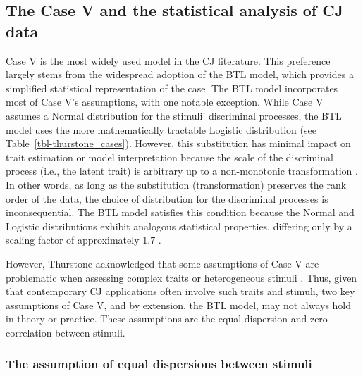 \documentclass[
  authoryear,
  review,
  1p]{elsarticle}
\begin{document}
\subsection{The Case V and the statistical analysis of CJ
data}\label{sec-theory-issue1}

Case V is the most widely used model in the CJ literature. This
preference largely stems from the widespread adoption of the BTL model,
which provides a simplified statistical representation of the case. The
BTL model incorporates most of Case V's assumptions, with one notable
exception. While Case V assumes a Normal distribution for the stimuli'
discriminal processes, the BTL model uses the more mathematically
tractable Logistic distribution \citep{Andrich_1978, Bramley_2008} (see
Table~\ref{tbl-thurstone_cases}). However, this substitution has minimal
impact on trait estimation or model interpretation because the scale of
the discriminal process (i.e., the latent trait) is arbitrary up to a
non-monotonic transformation
\citep{vanderLinden_et_al_2017_I, McElreath_2021}. In other words, as
long as the substitution (transformation) preserves the rank order of
the data, the choice of distribution for the discriminal processes is
inconsequential. The BTL model satisfies this condition because the
Normal and Logistic distributions exhibit analogous statistical
properties, differing only by a scaling factor of approximately \(1.7\)
\citep{vanderLinden_et_al_2017_I}.

However, Thurstone acknowledged that some assumptions of Case V are
problematic when assessing complex traits or heterogeneous stimuli
\citep{Thurstone_1927a}. Thus, given that contemporary CJ applications
often involve such traits and stimuli, two key assumptions of Case V,
and by extension, the BTL model, may not always hold in theory or
practice. These assumptions are the equal dispersion and zero
correlation between stimuli.

\subsubsection{The assumption of equal dispersions between
stimuli}\label{sec-theory-issue1a}
\end{document}
